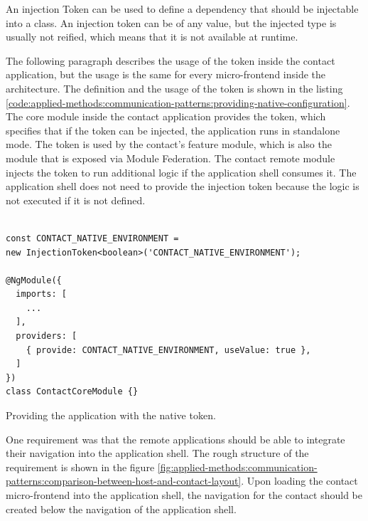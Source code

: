 \noindent An injection Token can be used to define a dependency that should be injectable into a class. An injection token can be of any value, but the injected type is usually not reified, which means that it is not available at runtime.\cite{misc:-:applied-methods:communication:angular-injection-token}


\bigskip

\noindent The following paragraph describes the usage of the token inside the contact application, but the usage is the same for every micro-frontend inside the architecture. The definition and the usage of the token is shown in the listing \ref{code:applied-methods:communication-patterns:providing-native-configuration}. The core module inside the contact application provides the token, which specifies that if the token can be injected, the application runs in standalone mode. The token is used by the contact's feature module, which is also the module that is exposed via Module Federation. The contact remote module injects the token to run additional logic if the application shell consumes it. The application shell does not need to provide the injection token because the logic is not executed if it is not defined.

\ifshowListings
  \begin{listing}[H]
  \begin{verbatim}

const CONTACT_NATIVE_ENVIRONMENT = 
new InjectionToken<boolean>('CONTACT_NATIVE_ENVIRONMENT');

@NgModule({
  imports: [
    ...
  ],
  providers: [
    { provide: CONTACT_NATIVE_ENVIRONMENT, useValue: true },
  ]
})
class ContactCoreModule {}
  \end{verbatim}
  \caption{Providing the application with the native token.}\label{code:applied-methods:communication-patterns:providing-native-configuration}
  \end{listing}
\fi

\noindent One requirement was that the remote applications should be able to integrate their navigation into the application shell. The rough structure of the requirement is shown in the figure \ref{fig:applied-methods:communication-patterns:comparison-between-host-and-contact-layout}. Upon loading the contact micro-frontend into the application shell, the navigation for the contact should be created below the navigation of the application shell.

